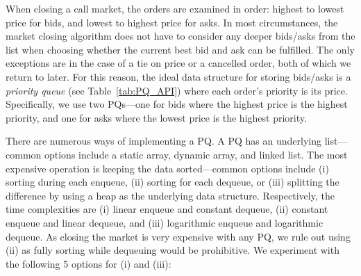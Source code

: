 When closing a call market, the orders are examined in order: highest to lowest price for bids, and lowest to highest price for asks. In most circumstances, the market closing algorithm does not have to consider any deeper bids/asks from the list when choosing whether the current best bid and ask can be fulfilled. The only exceptions are in the case of a tie on price or a cancelled order, both of which we return to later. For this reason, the ideal data structure for storing bids/asks is a \textit{priority queue} (see Table~\ref{tab:PQ_API}) where each order's priority is its price. Specifically, we use two PQs---one for bids where the highest price is the highest priority, and one for asks where the lowest price is the highest priority. 

There are numerous ways of implementing a PQ. A PQ has an underlying list---common options include a static array, dynamic array, and linked list. The most expensive operation is keeping the data sorted---common options include (i) sorting during each enqueue, (ii) sorting for each dequeue, or (iii) splitting the difference by using a heap as the underlying data structure. Respectively, the time complexities are (i) linear enqueue and constant dequeue, (ii) constant enqueue and linear dequeue, and (iii) logarithmic enqueue and logarithmic dequeue. As closing the market is very expensive with any PQ, we rule out using (ii) as fully sorting while dequeuing would be prohibitive. We experiment with the following 5 options for (i) and (iii):

